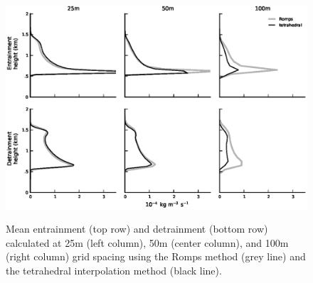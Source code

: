 \documentclass[12pt]{article}
\begin{document}
\begin{figure}[t]
  \noindent
  \includegraphics[width=39pc,angle=0]{./figures/resolution_dependence}\\
  \caption{Mean entrainment (top row) and detrainment (bottom row) calculated
  at 25m (left column), 50m (center column), and 100m (right column) grid 
  spacing using the Romps method (grey line) and the tetrahedral 
  interpolation method (black line).
  }
  \label{fig:resolution_dependence}
\end{figure}
\end{document}
